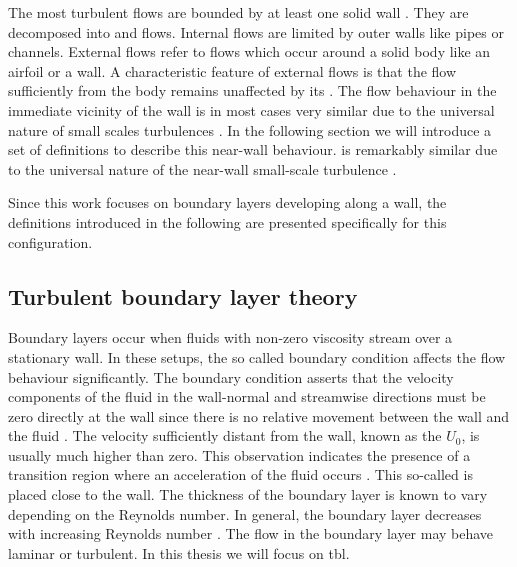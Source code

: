 The most turbulent flows are bounded by at least one solid wall \citep{moin_fundamentals_2024}.
They are decomposed into  and  flows. 
Internal flows are limited by outer walls like pipes or channels.
External flows refer to flows which occur around a solid body like an airfoil or a wall.
A characteristic feature of external flows is that the flow sufficiently from the body remains unaffected by its \citep{moin_fundamentals_2024}.
The flow behaviour in the immediate vicinity of the wall is in most cases very similar due to the universal nature of small scales turbulences \citep{pope_turbulent_2015}.
In the following section we will introduce a set of definitions to describe this near-wall behaviour.
is remarkably similar due to the universal nature of the near-wall small-scale turbulence \citep{pope_turbulent_2015}. 

Since this work focuses on boundary layers developing along a wall, the definitions introduced in the following are presented specifically for this configuration.

\subsection{Turbulent boundary layer theory} \label{subsec:TBLTheory}

Boundary layers occur when fluids with non-zero viscosity stream over a stationary wall. 
In these setups, the so called  boundary condition affects the flow behaviour significantly.
The  boundary condition  asserts that the velocity components of the fluid in the wall-normal and streamwise directions must be zero directly at the wall since there is no relative movement between the wall and the fluid \citep{schlichting_boundary-layer_2017}. 
The velocity sufficiently distant from the wall, known as the  $U_0$, is usually much higher than zero. This observation indicates the presence of a transition region where an acceleration of the fluid occurs \citep{prandtl_uber_1904}.
This so-called  is placed close to the wall. 
The thickness of the boundary layer is known to vary depending on the Reynolds number. In general, the boundary layer decreases with increasing Reynolds number \cite{schlichting_boundary-layer_2017}. 
The flow in the boundary layer may behave laminar or turbulent. In this thesis we will focus on \acrfull{tbl}.

